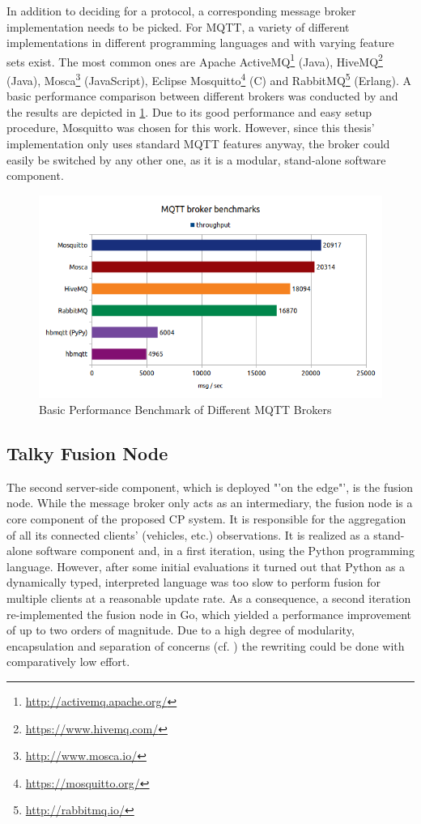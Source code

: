 In addition to deciding for a protocol, a corresponding message broker implementation needs to be picked. For MQTT, a variety of different implementations in different programming languages and with varying feature sets exist. The most common ones are Apache ActiveMQ\footnote{\url{http://activemq.apache.org/}} (Java), HiveMQ\footnote{\url{https://www.hivemq.com/}} (Java), Mosca\footnote{\url{http://www.mosca.io/}} (JavaScript), Eclipse Mosquitto\footnote{\url{https://mosquitto.org/}} (C) and RabbitMQ\footnote{\url{http://rabbitmq.io/}} (Erlang). A basic performance comparison between different brokers was conducted by \cite{Mutsch2019} and the results are depicted in \cref{fig:mqtt_benchmarks}. Due to its good performance and easy setup procedure, Mosquitto was chosen for this work. However, since this thesis' implementation only uses standard MQTT features anyway, the broker could easily be switched by any other one, as it is a modular, stand-alone software component.

\begin{figure}
	\centering
	\includegraphics[width=0.9\linewidth]{98_images/mqtt_bench_2}
	\caption[Basic Performance Benchmark of Different MQTT Brokers]{Basic Performance Benchmark of Different MQTT Brokers \cite{Mutsch2019}}
	\label{fig:mqtt_benchmarks}
\end{figure}

\subsection{Talky Fusion Node}
\label{subsec:implementation:edge_side_fusion_node}
The second server-side component, which is deployed "'on the edge"', is the fusion node. While the message broker only acts as an intermediary, the fusion node is a core component of the proposed CP system. It is responsible for the aggregation of all its connected clients' (vehicles, etc.) observations. It is realized as a stand-alone software component and, in a first iteration, using the Python programming language. However, after some initial evaluations it turned out that Python as a dynamically typed, interpreted language was too slow to perform fusion for multiple clients at a reasonable update rate. As a consequence, a second iteration re-implemented the fusion node in Go, which yielded a performance improvement of up to two orders of magnitude. Due to a high degree of modularity, encapsulation and separation of concerns (cf. \cite{Martin2017}) the rewriting could be done with comparatively low effort.

